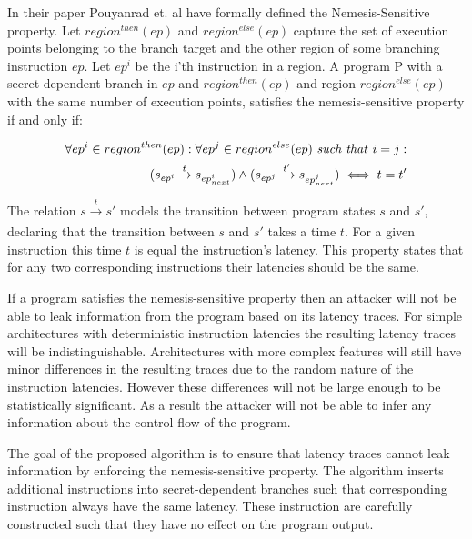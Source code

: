 In their paper Pouyanrad et. al have formally defined the Nemesis-Sensitive property.
Let $region^{then}(ep)$ and $region^{else}(ep)$ capture the set of execution points belonging to the branch target and the other region of some branching instruction $ep$.
Let $ep^i$ be the i'th instruction in a region. A program P with a secret-dependent branch in $ep$ and $region^{then}(ep)$ 
and region $region^{else}(ep)$ with the same number of execution points, satisfies the nemesis-sensitive property if and only if:  

\begin{equation} \label{eq:nemesisProperty}
    \begin{split}
    \forall ep^i \in region^{then}(ep) : \forall ep^j \in region^{else}(ep) \text{ \textit{such that} } i=j :  \\ 
    (s_{ep^i} \xrightarrow[]{t} s_{ep^i_{next}}) \land (s_{ep^j} \xrightarrow[]{t'} s_{ep^j_{next}}) \iff t = t' \\ 
    \end{split}
\end{equation}
\cite{MSP430Detection}

The relation $s \xrightarrow[]{t} s'$ models the transition between program states $s$ and $s'$, declaring that the transition between $s$ and $s'$ takes a time $t$. 
For a given instruction this time $t$ is equal the instruction's latency. This property states that for any two corresponding instructions their latencies should be the same.

If a program satisfies the nemesis-sensitive property then an attacker will not be able to leak information from the program based on its latency traces.
For simple architectures with deterministic instruction latencies the resulting latency traces will be indistinguishable. 
Architectures with more complex features will still have minor differences in the resulting traces due to the random nature of the instruction latencies. 
However these differences will not be large enough to be statistically significant.
As a result the attacker will not be able to infer any information about the control flow of the program. 

The goal of the proposed algorithm is to ensure that latency traces cannot leak information by enforcing the nemesis-sensitive property.
The algorithm inserts additional instructions into secret-dependent branches such that corresponding instruction always have the same latency. 
These instruction are carefully constructed such that they have no effect on the program output. 

